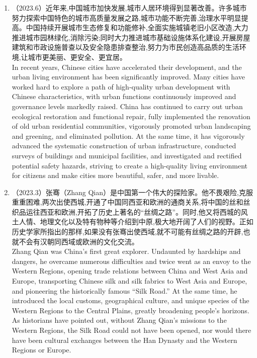 ﻿\documentclass[lang=cn,11pt]{elegantbook}
\begin{document}
\begin{enumerate}
    \item （2023.6）近年来,中国城市加快发展,城市人居环境得到显著改善。许多城市努力探索中国特色的城市高质量发展之路,城市功能不断完善,治理水平明显提高。中国持续开展城市生态修复和功能修补,全面实施城镇老旧小区改造,大力推进城市园林绿化,消除污染;同时大力推进城市基础设施体系化建设,开展房屋建筑和市政设施普查以及安全隐患排查整治,努力为市民创造高品质的生活环境,让城市更美丽、更安全、更宜居。\\In recent years, Chinese cities have accelerated their development, and the urban living environment has been significantly improved. Many cities have worked hard to explore a path of high-quality urban development with Chinese characteristics, with urban functions continuously improved and governance levels markedly raised. China has continued to carry out urban ecological restoration and functional repair, fully implemented the renovation of old urban residential communities, vigorously promoted urban landscaping and greening, and eliminated pollution. At the same time, it has vigorously advanced the systematic construction of urban infrastructure, conducted surveys of buildings and municipal facilities, and investigated and rectified potential safety hazards, striving to create a high-quality living environment for citizens and make cities more beautiful, safer, and more livable.
    \item （2023.3）张骞（Zhang Qian）是中国第一个伟大的探险家。他不畏艰险,克服重重困难,两次出使西城,开通了中国同西亚和欧洲的通商关系,将中国的丝和丝织品运往西亚和欧洲,开拓了历史上著名的“丝绸之路”。同时,他又将西城的风土人情、地理文化以及特有物种等介绍到中原,极大地开阔了人们的视野。正如历史学家所指出的那样,如果没有张骞出使西域,就不可能有丝绸之路的开辟,也就不会有汉朝同西域或欧洲的文化交流。\\Zhang Qian was China’s first great explorer. Undaunted by hardships and dangers, he overcame numerous difficulties and twice went as an envoy to the Western Regions, opening trade relations between China and West Asia and Europe, transporting Chinese silk and silk fabrics to West Asia and Europe, and pioneering the historically famous “Silk Road.” At the same time, he introduced the local customs, geographical culture, and unique species of the Western Regions to the Central Plains, greatly broadening people’s horizons. As historians have pointed out, without Zhang Qian’s missions to the Western Regions, the Silk Road could not have been opened, nor would there have been cultural exchanges between the Han Dynasty and the Western Regions or Europe.

\end{enumerate}
\end{document}
